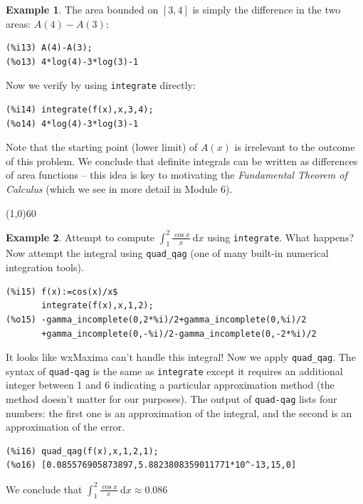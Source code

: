 \documentclass[10.5pt,twoside]{report}
\theoremstyle{definition}
\newtheorem{exmp}{Example}[section]
\begin{document}
\begin{exmp}
The area bounded on $[3,4]$ is simply the difference in the two areas:  $A(4)-A(3)$:

\begin{verbatim}
(%i13) A(4)-A(3);
(%o13) 4*log(4)-3*log(3)-1
\end{verbatim}

Now we verify by using \verb|integrate| directly:

\begin{verbatim}
(%i14) integrate(f(x),x,3,4);
(%o14) 4*log(4)-3*log(3)-1
\end{verbatim}

Note that the starting point (lower limit) of $A(x)$ is irrelevant to the outcome of this problem.  We conclude that definite integrals can be written as differences of area functions -- this idea is key to motivating the \textit{Fundamental Theorem of Calculus} (which we see in more detail in Module 6).

\end{exmp}

\line(1,0){60}
\linethickness{0.5mm}



\begin{exmp} Attempt to compute $\displaystyle \int_{1}^{2} \frac{\cos{x}}{x} \ \mathrm{d} x$ using \verb|integrate|.  What happens?  Now attempt the integral using \verb|quad_qag| (one of many built-in numerical integration tools).\\

\begin{verbatim}
(%i15) f(x):=cos(x)/x$
       integrate(f(x),x,1,2);
(%o15) -gamma_incomplete(0,2*%i)/2+gamma_incomplete(0,%i)/2
       +gamma_incomplete(0,-%i)/2-gamma_incomplete(0,-2*%i)/2
\end{verbatim}

It looks like wxMaxima can't handle this integral!  Now we apply \verb|quad_qag|.  The syntax of \verb|quad-qag| is the same as \verb|integrate| except it requires an additional integer between 1 and 6 indicating a particular approximation method (the method doesn't matter for our purposes).  The output of \verb|quad-qag| lists four numbers:  the first one is an approximation of the integral, and the second is an approximation of the error.

\begin{verbatim}
(%i16) quad_qag(f(x),x,1,2,1);
(%o16) [0.085576905873897,5.8823808359011771*10^-13,15,0]
\end{verbatim}

We conclude that $\displaystyle \int_{1}^{2} \frac{\cos{x}}{x} \ \mathrm{d} x \approx 0.086$ 


\end{exmp}
\end{document}
